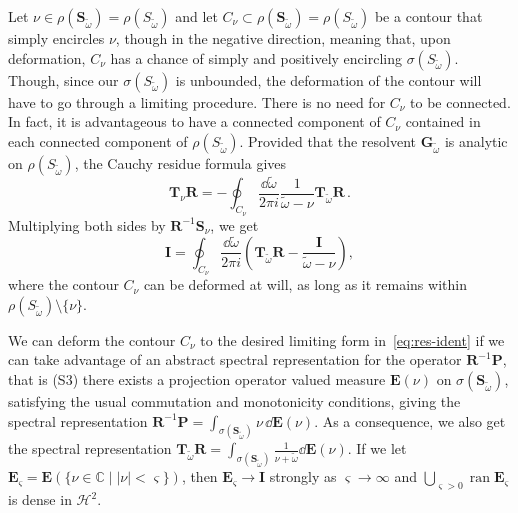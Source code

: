 \documentclass[aps, prd, amsmath, floats, floatfix, twocolumn, nofootinbib, superscriptaddress, showpacs]{revtex4-1}
\def\bC{{\mathbb C}}
\def\oo{\infty}
\def\H{\mathcal{H}}
\def\E{\mathbf{E}}
\def\P{\mathbf{P}}
\def\R{\mathbf{R}}
\def\bS{\mathbf{S}}
\def\G{\mathbf{G}}
\def\T{\mathbf{T}}
\def\tomega{{\tilde{\omega}}}
\begin{document}
Let $\nu \in \rho(\bS_\tomega) = \rho(S_\tomega)$ and let $C_\nu \subset \rho(\bS_\tomega) =
\rho(S_\tomega)$ be a contour that simply encircles $\nu$, though in the
negative direction, meaning that, upon deformation, $C_\nu$ has a chance
of simply and positively encircling $\sigma(S_\tomega)$. Though, since our
$\sigma(S_\tomega)$ is unbounded, the deformation of the contour will have to go
through a limiting procedure. There is no need for $C_\nu$ to be
connected. In fact, it is advantageous to have a connected component of
$C_\nu$ contained in each connected component of $\rho(S_\tomega)$. Provided
that the resolvent $\G_\tomega$ is analytic on $\rho(S_\tomega)$, the Cauchy
residue formula gives
\begin{equation}
\T_\nu \R = -\oint_{C_\nu} \frac{\dd\tomega}{2\pi i} \frac{1}{\tomega -\nu} \T_\tomega \R \, .
\end{equation}
Multiplying both sides by $\R^{-1}\bS_\nu$, we get
\begin{equation} \label{eq:cauchy-Cnu}
\mathbf{I} = \oint_{C_\nu} \frac{\dd\tomega}{2\pi i}
\left(
\T_\tomega \R - \frac{\mathbf{I}}{\tomega-\nu}
\right) ,
\end{equation}
where the contour $C_\nu$ can be deformed at will, as long as it remains
within $\rho(S_\tomega) \setminus \{\nu\}$.

We can deform the contour $C_\nu$ to the desired limiting form
in~\eqref{eq:res-ident} if we can take advantage of an abstract spectral
representation for the operator $\R^{-1}\P$, that is (S3) there exists a
projection operator valued measure $\E(\nu)$ on $\sigma(\bS_\tomega)$,
satisfying the usual commutation and monotonicity conditions, giving the
spectral representation $\R^{-1}\P = \int_{\sigma(\bS_\tomega)} \nu \, \dd \E(\nu)$.
As a consequence, we also get the spectral representation $\T_\tomega \R =
\int_{\sigma(\bS_\tomega)} \frac{1}{\nu+\tomega} \dd \E(\nu)$. If we let
$\E_\varsigma = \E(\{\nu \in \bC \mid |\nu|<\varsigma\})$, then
$\E_\varsigma \to \mathbf{I}$ strongly as $\varsigma \to \oo$ and
$\bigcup_{\varsigma>0} \operatorname{ran} \E_\varsigma $ is dense in $\H^2$.
\end{document}
